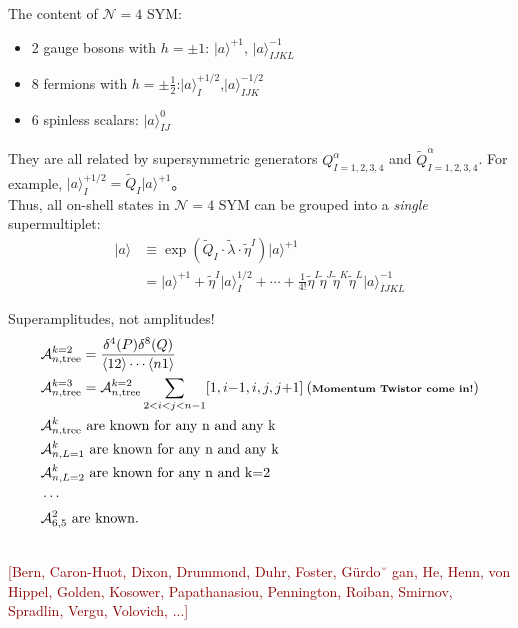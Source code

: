 \documentclass[10pt]{beamer}
\begin{document}
\begin{frame}
The content of $\mathcal{N}=4$ SYM: 
\begin{itemize}
  \item 2 gauge bosons with $h=\pm1$: \quad$\vert a \rangle^{+1}$, $\vert a \rangle^{-1}_{IJKL}$
  \item 8 fermions with $h=\pm\frac{1}{2}$:\qquad\quad\:\:$\vert a \rangle^{+1/2}_{I}$,$\vert a \rangle^{-1/2}_{IJK}$
  \item {6 spinless scalars}:  \qquad\qquad\qquad\:\!$\vert a \rangle^{0}_{IJ}$
  \end{itemize}
They are all related by supersymmetric generators $Q_{I=1,2,3,4}^{\alpha}$ and $\tilde{Q}_{I=1,2,3,4}^{\dot{\alpha}}$. For example, $\vert a \rangle^{+1/2}_{I}=\tilde{Q}_{I}\vert a \rangle^{+1}$。 \\Thus, all on-shell states in $\mathcal{N}=4$ SYM can be grouped into a \emph{single} supermultiplet:
\begin{align*}
  \vert a\rangle &\equiv \exp(\tilde{Q}_{I}\cdot\tilde{\lambda}\cdot\tilde{\eta}^{I})\vert a\rangle^{+1} \\
  &= \vert a \rangle^{+1}+\tilde{\eta}^{I}\vert a\rangle_{I}^{1/2}+\cdots+\frac{1}{4!}\tilde{\eta}^{I}\tilde{\eta}^{J}\tilde{\eta}^{K}\tilde{\eta}^{L}\vert a \rangle^{-1}_{IJKL}
\end{align*} 
\end{frame}




\begin{frame}

  \begin{alertblock}{Superamplitudes, not amplitudes!}
    \phantom{af}\\
    \begin{align*}
      &\mathcal{A}_{n,\text{tree}}^{k=2}=\frac{\delta^{4}(P)\delta^{8}(Q)}{\langle 12\rangle\cdots\langle n1\rangle} \\
      &\mathcal{A}_{n,\text{tree}}^{k=3}=\mathcal{A}_{n,\text{tree}}^{k=2} \sum_{2<i<j<n-1}[1,i{-}1,i,j,j{+}1] \:(\textbf{\scriptsize{Momentum Twistor come in!}})\\
      &\mathcal{A}_{n,\text{tree}}^{k}\text{ are known for any n and any k} \\
      &\mathcal{A}_{n,L=1}^{k}\text{ are known for any n and any k} \\
      &\mathcal{A}_{n,L=2}^{k}\text{ are known for any n and k=2} \\ 
      &\cdots \\
      &\mathcal{A}_{6,5}^{2} \text{ are known.} 
    \end{align*}
  \end{alertblock}
  \\
  \footnotesize{\textcolor{darkred}{[Bern, Caron-Huot, Dixon, Drummond, Duhr, Foster, Gürdo˘ gan, He, Henn, von Hippel, Golden,
   Kosower, Papathanasiou, Pennington, Roiban, Smirnov, Spradlin, Vergu, Volovich, ...]}}
\end{frame}
\end{document}
